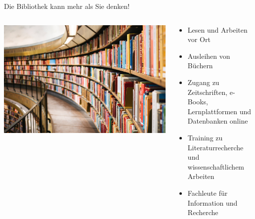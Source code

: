 \documentclass{beamer}
\begin{document}
\begin{frame}{Die Bibliothek kann mehr als Sie denken!}

\begin{columns}[c]
    \begin{column}{5cm}
    \begin{center}
    \includegraphics[width=\textwidth]{susan-q-yin-2JIvboGLeho-unsplash.jpg}
\end{center}

    \end{column}
        \begin{column}{7cm}
\begin{itemize}
    \item 
Lesen und Arbeiten vor Ort
\item 
Ausleihen von Büchern
\item 
    Zugang zu Zeitschriften, e-Books, Lernplattformen und Datenbanken online
    \item 
    Training zu Literaturrecherche und wissenschaftlichem Arbeiten
    \item 
    Fachleute für Information und Recherche
\end{itemize}
        
    \end{column}

\end{columns}

\end{frame}
\end{document}
